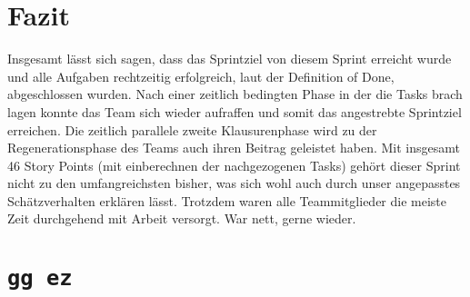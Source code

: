 \documentclass[12pt,a4paper, oneside]{article}
\begin{document}
\section{Fazit}
Insgesamt lässt sich sagen, dass das Sprintziel von diesem Sprint erreicht wurde und alle Aufgaben rechtzeitig erfolgreich, laut der Definition of Done, abgeschlossen wurden. Nach einer zeitlich bedingten Phase in der die Tasks brach lagen konnte das Team sich wieder aufraffen und somit das angestrebte Sprintziel erreichen. Die zeitlich parallele zweite Klausurenphase wird zu der Regenerationsphase des Teams auch ihren Beitrag geleistet haben. Mit insgesamt 46 Story Points (mit einberechnen der nachgezogenen Tasks) gehört dieser Sprint nicht zu den umfangreichsten bisher, was sich wohl auch durch unser angepasstes Schätzverhalten erklären lässt. Trotzdem waren alle Teammitglieder die meiste Zeit durchgehend mit Arbeit versorgt.
War nett, gerne wieder.
\section*{\LARGE\texttt{gg ez}}
\end{document}
